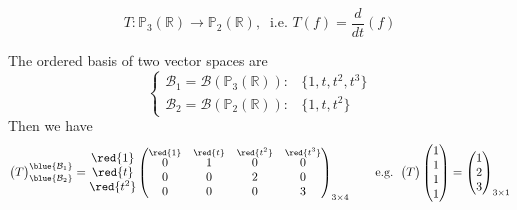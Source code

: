 \begin{eg}
    \[
        T: \mathbb{P}_3(\mathbb{R}) \to \mathbb{P}_2(\mathbb{R}), \ \text{ i.e. } T(f) = \frac{d}{dt} (f)
    \]
\end{eg}
The ordered basis of two vector spaces are
\[
    \begin{cases}
        \mathcal{B}_1 = \mathcal{B}(\mathbb{P}_3(\mathbb{R})): & \{1, t, t^2, t^3\} \\
        \mathcal{B}_2 = \mathcal{B}(\mathbb{P}_2(\mathbb{R})): & \{1, t, t^2\}
    \end{cases}
\]
Then we have
\[
    \begin{pmatrix}
        T
    \end{pmatrix}_{\blue{\mathcal{B}_2}}^{\blue{\mathcal{B}_1}} = \begin{matrix} 
        \red{1} \\ \red{t} \\ \red{t^2}
    \end{matrix}
    \begin{pmatrix}
        \overset{\red{1}}{0} & \overset{\red{t}}{1} & \overset{\red{t^2}}{0} & \overset{\red{t^3}}{0} \\
        0 & 0 & 2 & 0 \\
        0 & 0 & 0 & 3
    \end{pmatrix}_{3 \times 4} \quad \quad \text{e.g. }
    \begin{pmatrix}
        T
    \end{pmatrix} \begin{pmatrix}
        1 \\ 1 \\ 1 \\ 1
    \end{pmatrix} = \begin{pmatrix}
        1 \\ 2 \\ 3
    \end{pmatrix}_{3 \times 1}
\]

